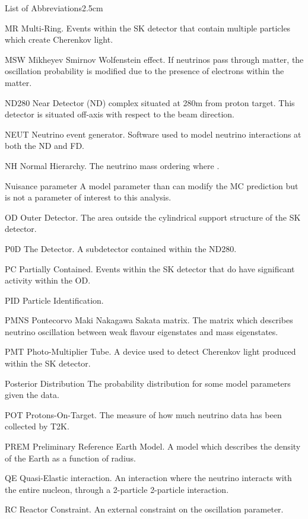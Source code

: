 \begin{mclistof}{List of Abbreviations}{2.5cm}
\item[MR]Multi-Ring. Events within the SK detector that contain multiple particles which create Cherenkov light.
\item[MSW]Mikheyev Smirnov Wolfenstein effect. If neutrinos pass through matter, the oscillation probability is modified due to the presence of electrons within the matter.
\item[ND280]Near Detector (ND) complex situated at 280m from proton target. This detector is situated \quickmath{2.5\deg} off-axis with respect to the beam direction.
\item[NEUT]Neutrino event generator. Software used to model neutrino interactions at both the ND and FD.
\item[NH]Normal Hierarchy. The neutrino mass ordering where .
\item[Nuisance parameter]A model parameter than can modify the MC prediction but is not a parameter of interest to this analysis.
\item[OD]Outer Detector. The area outside the cylindrical support structure of the SK detector.
\item[P0D]The  Detector. A subdetector contained within the ND280.
\item[PC]Partially Contained. Events within the SK detector that do have significant activity within the OD.
\item[PID]Particle Identification.
\item[PMNS]Pontecorvo Maki Nakagawa Sakata matrix. The matrix which describes neutrino oscillation between weak flavour eigenstates and mass eigenstates.
\item[PMT]Photo-Multiplier Tube. A device used to detect Cherenkov light produced within the SK detector.
\item[Posterior Distribution]The probability distribution for some model parameters given the data.
\item[POT]Protons-On-Target. The measure of how much neutrino data has been collected by T2K.
\item[PREM]Preliminary Reference Earth Model. A model which describes the density of the Earth as a function of radius.
\item[QE]Quasi-Elastic interaction. An interaction where the neutrino interacts with the entire nucleon, through a 2-particle \quickmath{\rightarrow} 2-particle interaction.
\item[RC]Reactor Constraint. An external constraint on the  oscillation parameter.

\end{mclistof}
